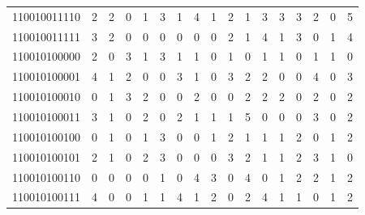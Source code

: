 \documentclass[10pt,a4paper]{article}
\begin{document}
\begin{longtable}{ |c|c|c|c|c|c|c|c|c|c|c|c|c|c|c|c|c| }
    110010011110              & 2                            & 2                                & 0                            & 1                              & 3   & 1   & 4   & 1   & 2   & 1   & 3   & 3   & 3   & 2   & 0   & 5   \\
    110010011111              & 3                            & 2                                & 0                            & 0                              & 0   & 0   & 0   & 0   & 2   & 1   & 4   & 1   & 3   & 0   & 1   & 4   \\
    110010100000              & 2                            & 0                                & 3                            & 1                              & 3   & 1   & 1   & 0   & 1   & 0   & 1   & 1   & 0   & 1   & 1   & 0   \\
    110010100001              & 4                            & 1                                & 2                            & 0                              & 0   & 3   & 1   & 0   & 3   & 2   & 2   & 0   & 0   & 4   & 0   & 3   \\
    110010100010              & 0                            & 1                                & 3                            & 2                              & 0   & 0   & 2   & 0   & 0   & 2   & 2   & 2   & 0   & 2   & 0   & 2   \\
    110010100011              & 3                            & 1                                & 0                            & 2                              & 0   & 2   & 1   & 1   & 1   & 5   & 0   & 0   & 0   & 3   & 0   & 2   \\
    110010100100              & 0                            & 1                                & 0                            & 1                              & 3   & 0   & 0   & 1   & 2   & 1   & 1   & 1   & 2   & 0   & 1   & 2   \\
    110010100101              & 2                            & 1                                & 0                            & 2                              & 3   & 0   & 0   & 0   & 3   & 2   & 1   & 1   & 2   & 3   & 1   & 0   \\
    110010100110              & 0                            & 0                                & 0                            & 0                              & 1   & 0   & 4   & 3   & 0   & 4   & 0   & 1   & 2   & 2   & 1   & 2   \\
    110010100111              & 4                            & 0                                & 0                            & 1                              & 1   & 4   & 1   & 2   & 0   & 2   & 4   & 1   & 1   & 0   & 1   & 2   \\

\end{longtable}
\end{document}
